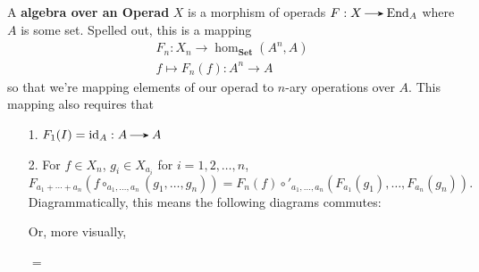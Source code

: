 \begin{definition}
    A \textbf{algebra over an Operad} $X$ is a morphism of operads $F: X \to \aend_A$ 
    where $A$ is some set. Spelled out, this is a mapping 
    \begin{align*}
        F_n: X_n \to \hom_{\textbf{Set}}(A^n, A)\\
        f \mapsto F_n(f): A^n \to A 
    \end{align*}
    so that we're mapping elements of our operad
    to $n$-ary operations over $A$. This mapping also requires that
    \begin{itemize}
        \item[1.] $F_1(I) = \id_A: A \to A$
        \item[2.] For $f \in X_n$, $g_i \in X_{a_i}$ for $i = 1,2, \dots, n$, 
        \[
            F_{a_1 + \cdots + a_n}(f \circ_{a_1, \dots, a_n}(g_1, \dots, g_n))
            =
            F_n(f)\circ'_{a_1, \dots, a_n}(F_{a_1}(g_1), \dots, F_{a_n}(g_n)).
        \]  
        Diagrammatically, this means the following diagrams commutes:
        \begin{center}
        \end{center}
        Or, more visually, 
        \begin{center}
            $=$
\end{center}
\end{itemize}
\end{definition}
